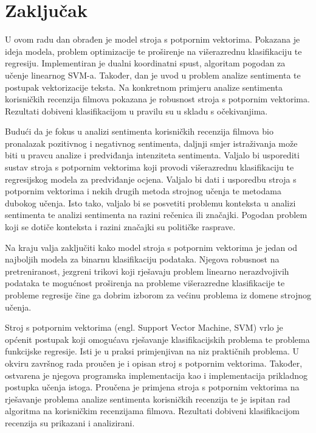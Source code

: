 \documentclass[times, utf8, zavrsni, numeric]{fer}
\begin{document}
\chapter{Zaključak} \label{zakljucak}
U ovom radu dan obrađen je model stroja s potpornim vektorima.
Pokazana je ideja modela, problem optimizacije te proširenje na višerazrednu klasifikaciju te regresiju.
Implementiran je dualni koordinatni spust, algoritam pogodan za učenje linearnog SVM-a.
Također, dan je uvod u problem analize sentimenta te postupak vektorizacije teksta.
Na konkretnom primjeru analize sentimenta korisničkih recenzija filmova pokazana je robusnost stroja
s potpornim vektorima.
Rezultati dobiveni klasifikacijom u pravilu su u skladu s očekivanjima.
\par Budući da je fokus u analizi sentimenta korisničkih recenzija filmova bio pronalazak pozitivnog i 
negativnog sentimenta, daljnji smjer istraživanja može biti u pravcu analize i predviđanja intenziteta
sentimenta. Valjalo bi usporediti sustav stroja s potpornim vektorima koji provodi višerazrednu klasifikaciju
te regresijskog modela za predviđanje ocjena. Valjalo bi dati i usporedbu stroja s potpornim vektorima
i nekih drugih metoda strojnog učenja te metodama dubokog učenja.
Isto tako, valjalo bi se posvetiti problemu konteksta u analizi sentimenta te analizi sentimenta na razini
rečenica ili značajki. Pogodan problem koji se dotiče konteksta i razini značajki su političke rasprave.
\par Na kraju valja zaključiti kako model stroja s potpornim vektorima je jedan od najboljih modela za
binarnu klasifikaciju podataka.
Njegova robusnost na pretreniranost, jezgreni trikovi koji rješavaju problem linearno nerazdvojivih podataka
te mogućnost proširenja na probleme višerazredne klasifikacije te probleme regresije čine ga dobrim izborom
za većinu problema iz domene strojnog učenja.




\begin{sazetak}
Stroj s potpornim vektorima (engl. Support Vector Machine, SVM) vrlo je općenit postupak koji 
omogućava rješavanje klasifikacijskih problema te problema funkcijske regresije. 
Isti je u praksi primjenjivan na niz praktičnih problema. 
U okviru završnog rada proučen je i opisan stroj s potpornim vektorima. 
Također, ostvarena je njegova programska implementacija kao i implementacija prikladnog postupka učenja 
istoga. Proučena je primjena stroja s potpornim vektorima na rješavanje problema analize sentimenta 
korisničkih recenzija te je ispitan rad algoritma na korisničkim recenzijama filmova.
Rezultati dobiveni klasifikacijom recenzija su prikazani i analizirani. 


\end{sazetak}
\end{document}
